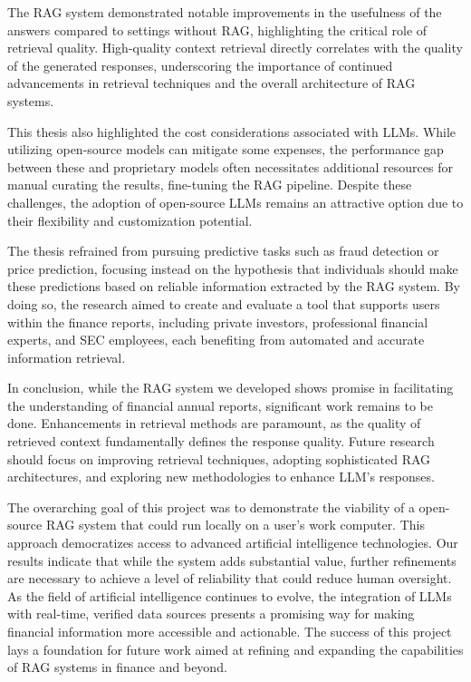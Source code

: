 The RAG system demonstrated notable improvements in the usefulness of the answers compared to settings without RAG, highlighting the critical role of retrieval quality. High-quality context retrieval directly correlates with the quality of the generated responses, underscoring the importance of continued advancements in retrieval techniques and the overall architecture of RAG systems.

This thesis also highlighted the cost considerations associated with LLMs. While utilizing open-source models can mitigate some expenses, the performance gap between these and proprietary models often necessitates additional resources for manual curating the results, fine-tuning the RAG pipeline. Despite these challenges, the adoption of open-source LLMs remains an attractive option due to their flexibility and customization potential.

The thesis refrained from pursuing predictive tasks such as fraud detection or price prediction, focusing instead on the hypothesis that individuals should make these predictions based on reliable information extracted by the RAG system. By doing so, the research aimed to create and evaluate a tool that supports users within the finance reports, including private investors, professional financial experts, and SEC employees, each benefiting from automated and accurate information retrieval.

In conclusion, while the RAG system we developed shows promise in facilitating the understanding of financial annual reports, significant work remains to be done. Enhancements in retrieval methods are paramount, as the quality of retrieved context fundamentally defines the response quality. Future research should focus on improving retrieval techniques, adopting sophisticated RAG architectures, and exploring new methodologies to enhance LLM's responses.

The overarching goal of this project was to demonstrate the viability of a open-source RAG system that could run locally on a user's work computer. This approach democratizes access to advanced artificial intelligence technologies. Our results indicate that while the system adds substantial value, further refinements are necessary to achieve a level of reliability that could reduce human oversight. As the field of artificial intelligence continues to evolve, the integration of LLMs with real-time, verified data sources presents a promising way for making financial information more accessible and actionable. The success of this project lays a foundation for future work aimed at refining and expanding the capabilities of RAG systems in finance and beyond.



